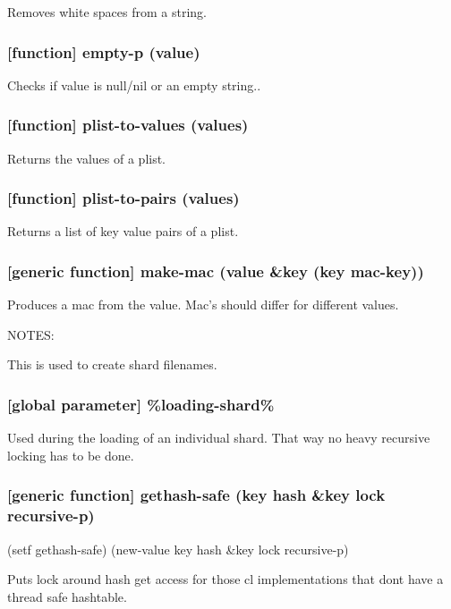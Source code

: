 \documentclass[11pt]{article}
\begin{document}
Removes white spaces from a string.

\subsubsection{[function] empty-p (value)}
\label{sec:orgbc8fc5f}

Checks if value is null/nil or an empty string..

\subsubsection{[function] plist-to-values (values)}
\label{sec:org1c177f8}

Returns the values of a plist.

\subsubsection{[function] plist-to-pairs (values)}
\label{sec:org329912b}

Returns a list of key value pairs of a plist.

\subsubsection{[generic function] make-mac (value \&key (key \textbf{mac-key}))}
\label{sec:org1b10707}

Produces a mac from the value. Mac's should differ for different values.

NOTES:

This is used to create shard filenames.

\subsubsection{[global parameter] \%loading-shard\%}
\label{sec:org8c6d072}

Used during the loading of an individual shard. That way no heavy
recursive locking has to be done.

\subsubsection{[generic function] gethash-safe (key hash \&key lock recursive-p)}
\label{sec:orgf6acec4}
(setf gethash-safe) (new-value key hash \&key lock recursive-p)

Puts lock around hash get access for those cl implementations that
dont have a thread safe hashtable.
\end{document}
